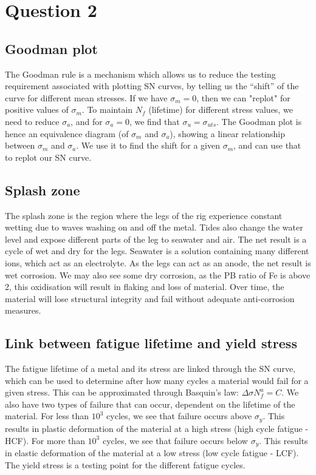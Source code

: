 \documentclass[11pt]{article}
\numberwithin{equation}{section}
\begin{document}
\section{Question 2}
\subsection{Goodman plot}
The Goodman rule is a mechanism which allows us to reduce the testing requirement associated with plotting SN curves, by telling us the “shift” of  the curve for different mean stresses. If we have $\sigma_m = 0$, then we can "replot" for positive values of $\sigma_m$. To maintain $N_{f}$ (lifetime) for different stress values, we need to reduce $\sigma_a$, and for $\sigma_a = 0$, we find that $\sigma_u = \sigma_{uts}$. The Goodman plot is hence an equivalence diagram (of $\sigma_m$ and $\sigma_a$), showing a linear relationship between $\sigma_m$ and $\sigma_a$. We use it to find the shift for a given $\sigma_m$, and can use that to replot our SN curve. 
\subsection{Splash zone}
The splash zone is the region where the legs of the rig experience constant wetting due to waves washing on and off the metal. Tides also change the water level and expose different parts of the leg to seawater and air. The net result is a cycle of wet and dry for the legs. Seawater is a solution containing many different ions, which act as an electrolyte. As the legs can act as an anode, the net result is wet corrosion. We may also see some dry corrosion, as the PB ratio of Fe is above 2, this oxidisation will result in flaking and loss of material. Over time, the material will lose structural integrity and fail without adequate anti-corrosion measures. 
\subsection{Link between fatigue lifetime and yield stress}
The fatigue lifetime of a metal and its stress are linked through the SN curve, which can be used to determine after how many cycles a material would fail for a given stress. This can be approximated through Basquin's law: $\Delta \sigma N_f^a = C$. We also have two types of failure that can occur, dependent on the lifetime of the material. For less than $10^3$ cycles, we see that failure occurs above $\sigma_y$. This results in plastic deformation of the material at a high stress (high cycle fatigue - HCF). For more than $10^3$ cycles, we see that failure occurs below $\sigma_y$. This results in elastic deformation of the material at a low stress (low cycle fatigue - LCF). The yield stress is a testing point for the different fatigue cycles. 
\begin{thebibliography}{00}

\end{thebibliography}
\end{document}
